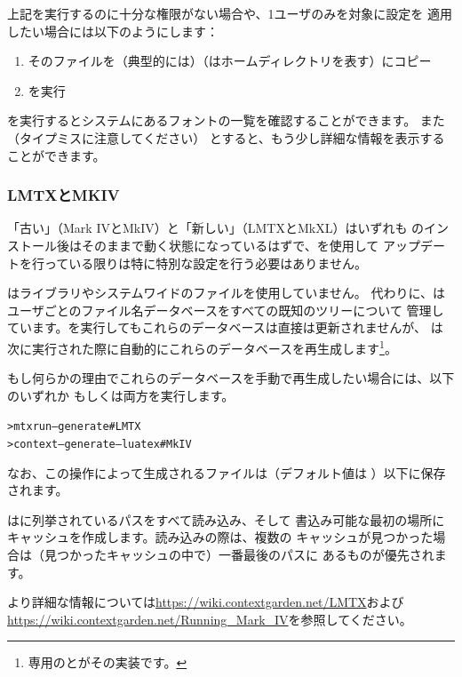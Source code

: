 \documentclass[uplatex,dvipdfmx,12pt,tombow]{jsarticle}
\begin{document}
上記を実行するのに十分な権限がない場合や、1ユーザのみを対象に設定を
適用したい場合には以下のようにします：
%
\begin{enumerate}
\item そのファイルを（典型的には）（\dir{~}はホームディレクトリを表す）にコピー
\item {}を実行
\end{enumerate}

を実行するとシステムにあるフォントの一覧を確認することができます。
また（タイプミスに注意してください）
とすると、もう少し詳細な情報を表示することができます。

\subsubsection{{\ConTeXt} LMTXとMKIV}
\label{sec:context}

「古い」\ConTeXt （Mark IVとMkIV）と「新しい」\ConTeXt （LMTXとMkXL）はいずれも
\TL のインストール後はそのままで動く状態になっているはずで、を使用して
アップデートを行っている限りは特に特別な設定を行う必要はありません。

\ConTeXt は\KPS ライブラリやシステムワイドのファイルを使用していません。
代わりに、\ConTeXt はユーザごとのファイル名データベースをすべての既知のツリーについて
管理しています。を実行してもこれらのデータベースは直接は更新されませんが、
\ConTeXt は次に実行された際に自動的にこれらのデータベースを再生成します\footnote{\TL
専用のとがその実装です。}。

もし何らかの理由でこれらのデータベースを手動で再生成したい場合には、以下のいずれか
もしくは両方を実行します。
%
\begin{alltt}
> mtxrun --generate            # LMTX
> context --generate --luatex  # MkIV
\end{alltt}

なお、この操作によって生成されるファイルは（デフォルト値は
）以下に保存されます。

\ConTeXt はに列挙されているパスをすべて読み込み、そして
書込み可能な最初の場所にキャッシュを作成します。読み込みの際は、複数の
キャッシュが見つかった場合は（見つかったキャッシュの中で）一番最後のパスに
あるものが優先されます。

より詳細な情報については\url{https://wiki.contextgarden.net/LMTX}および
\url{https://wiki.contextgarden.net/Running_Mark_IV}を参照してください。
\end{document}
